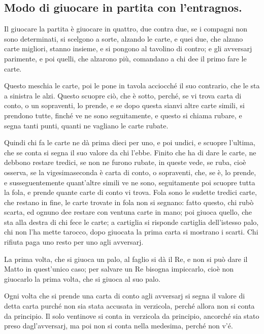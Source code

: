 \documentclass[11pt,a6paper]{article}
\begin{document}
\subsection{Modo di giuocare in partita
con l'entragnos.}

Il giuocare la partita è giuocare in quattro,
due contra due, se i compagni non sono
determinati, si scelgono a sorte, alzando le
carte, e quei due, che alzano carte migliori,
stanno insieme, e si pongono al tavolino di
contro; e gli avversarj parimente, e poi
quelli, che alzarono più, comandano a chi
dee il primo fare le carte.

Questo meschia le carte, poi le pone in
tavola acciocché il suo contrario, che le sta
a sinistra le alzi. Questo scuopre ciò, che è
sotto, perché, se vi trova carta di conto, o
un sopraventi, lo prende, e se dopo questa
sianvi altre carte simili, si prendono tutte,
finché ve ne sono seguitamente, e questo si
chiama rubare, e segna tanti punti, quanti
ne vagliano le carte rubate.

Quindi chi fa le carte ne dà prima dieci
per uno, e poi undici, e scuopre l'ultima, che
se conta si segna il suo valore da chi l'ebbe.
Finito che ha di dare le carte, ne debbono restare
tredici, se non ne furono rubate, in queste
vede, se ruba, cioè osserva, se la vigesimaseconda
è carta di conto, o sopraventi,
che, se è, lo prende, e susseguentemente
quant'altre simili ve ne sono, seguitamente
poi scuopre tutta la fola, e prende quante
carte di conto vi trova. Fola sono le sudette
tredici carte, che restano in fine, le carte
trovate in fola non si segnano: fatto questo,
chi rubò scarta, ed ognuno dee restare con
ventuna carte in mano; poi giuoca quello,
che sta alla destra di chi fece le carte; a cartiglia
si risponde cartiglia dell'istesso palo, chi
non l'ha mette tarocco, dopo giuocata la prima
carta si mostrano i scarti. Chi rifiuta paga
uno resto per uno agli avversarj.

La prima volta, che si giuoca un palo,
al faglio si dà il Re, e non si può dare il Matto
in quest'unico caso; per salvare un Re bisogna
impiccarlo, cioè non giuocarlo la prima volta,
che si giuoca al suo palo.

Ogni volta che si prende una carta di conto
agli avversarj si segna il valore di detta carta
purché non sia stata accusata in verzicola,
perché allora non si conta da principio. Il
solo ventinove si conta in verzicola da principio,
ancorché sia stato preso dagl'avversarj,
ma poi non si conta nella medesima, perché
non v'é.
\end{document}
